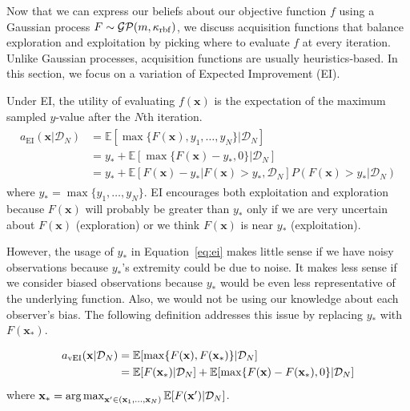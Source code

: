 Now that we can express our beliefs about our objective function $f$
using a Gaussian process $F \sim \mathcal{GP}(m, \kappa_{\mathrm{rbf}})$,
we discuss acquisition functions that balance
exploration and exploitation by picking where to evaluate $f$ at every iteration.
Unlike Gaussian processes, acquisition functions are usually heuristics-based.
In this section, we focus on a variation of Expected Improvement (EI).

Under EI, the utility of evaluating $f(\mathbf{x})$ is the expectation of the maximum sampled $y$-value after the $N$th iteration.
\begin{align}
    \label{eq:ei}
    \begin{split}
        a_{\mathrm{EI}}(\mathbf{x} | \mathcal{D}_N) & = \mathbb{E}[\max\{F(\mathbf{x}), y_1, \dots, y_N\} | \mathcal{D}_N] \\
        & = y_* + \mathbb{E}[\max\{F(\mathbf{x}) - y_*, 0\} |\mathcal{D}_N] \\
        & = y_* + \mathbb{E}[F(\mathbf{x}) - y_* | F(\mathbf{x}) > y_*, \mathcal{D}_N]P(F(\mathbf{x}) > y_* | \mathcal{D}_N)
    \end{split}
\end{align}
where $y_* = \max\{y_1, \dots, y_N\}$.
EI encourages both exploitation and exploration because $F(\mathbf{x})$ will probably be greater than $y_*$ only if we are very uncertain about $F(\mathbf{x})$ (exploration) or we think $F(\mathbf{x})$ is near $y_*$ (exploitation).

However, the usage of $y_*$ in Equation~\ref{eq:ei} makes little sense if we have noisy observations because $y_*$'s extremity could be due to noise.
It makes less sense if we consider biased observations because $y_*$ would be even less representative of the underlying function.
Also, we would not be using our knowledge about each observer's bias.
The following definition addresses this issue by replacing $y_*$ with $F(\mathbf{x}_*)$.

\begin{definition}[vEI]
    \begin{equation}
        \begin{split}
            a_{\mathrm{vEI}}(\mathbf{x} | \mathcal{D}_N) & = \mathbb{E}[\max \{ F(\mathbf{x}), F(\mathbf{x}_*) \} | \mathcal{D}_N] \\
            & = \mathbb{E}[F(\mathbf{x}_*) | \mathcal{D}_N] + \mathbb{E}[\max \{ F(\mathbf{x}) - F(\mathbf{x}_*), 0 \} | \mathcal{D}_N]
        \end{split}
        \label{eq:vei}
    \end{equation}
    where $\mathbf{x}_* = \operatorname*{arg\,max}_{\mathbf{x'} \in (\mathbf{x}_1, \dots, \mathbf{x}_N)} \mathbb{E}[F(\mathbf{x'}) | \mathcal{D}_N]$.
\end{definition}

